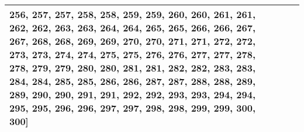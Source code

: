 \documentclass[]{article}
\begin{document}
\begin{table}[!ht]
\begin{tabular}{|m{2.8cm}|>{\centering\arraybackslash}m{2.8cm}|>{\centering\arraybackslash}m{2.8cm}|>{\centering\arraybackslash}m{2.8cm}|>{\centering\arraybackslash}m{2.8cm}|}
256, 257, 257, 258, 258, 259, 259, 260, 260, 261, 261, 262, 262, 263, 263, 264, 264, 265, 265, 266, 266, 267, 267, 268, 268, 269, 269, 270, 270, 271, 271, 272, 272, 273, 273, 274, 274, 275, 275, 276, 276, 277, 277, 278, 278, 279, 279, 280, 280, 281, 281, 282, 282, 283, 283, 284, 284, 285, 285, 286, 286, 287, 287, 288, 288, 289, 289, 290, 290, 291, 291, 292, 292, 293, 293, 294, 294, 295, 295, 296, 296, 297, 297, 298, 298, 299, 299, 300, 300]}\\
		\hline
	\end{tabular}
\end{table}
\end{document}

